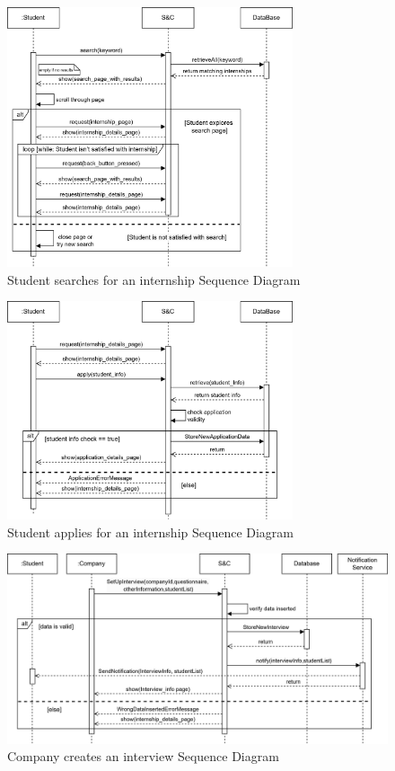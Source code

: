 \begin{figure}[H]
    \centering
    \includegraphics[width=0.75\textwidth]{Images/Sequence_Diagrams/searchInt_SD.png}
    \caption{Student searches for an internship Sequence Diagram}
\end{figure}
\begin{figure}[H]
    \centering
    \includegraphics[width=0.75\textwidth]{Images/Sequence_Diagrams/applyInt_SD.png}
    \caption{Student applies for an internship Sequence Diagram}
\end{figure}
\begin{figure}[H]
    \centering
    \includegraphics[width=1\textwidth]{Images/Sequence_Diagrams/createIntvw_SD.png}
    \caption{Company creates an interview Sequence Diagram}
\end{figure}
